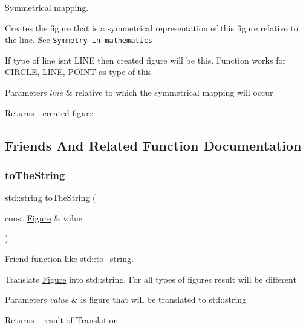 Symmetrical mapping. 

Creates the figure that is a symmetrical representation of \textquotesingle{}this\textquotesingle{} figure relative to the \textquotesingle{}line\textquotesingle{}. See \href{https://en.wikipedia.org/wiki/Symmetry_in_mathematics}{\tt Symmetry in mathematics}

If type of \textquotesingle{}line\textquotesingle{} isn\textquotesingle{}t L\+I\+NE then created figure will be \textquotesingle{}this\textquotesingle{}. Function works for C\+I\+R\+C\+LE, L\+I\+NE, P\+O\+I\+NT as type of \textquotesingle{}this\textquotesingle{}


\begin{DoxyParams}{Parameters}
{\em line} & relative to which the symmetrical mapping will occur \\
\hline
\end{DoxyParams}
\begin{DoxyReturn}{Returns}
-\/ created figure 
\end{DoxyReturn}


\subsection{Friends And Related Function Documentation}
\mbox{\label{classfop_1_1_figure_a64f76b9a0cc2e1c8d1f1a8a025e76078}} 
\subsubsection{\texorpdfstring{to\+The\+String}{toTheString}}
{\footnotesize\ttfamily std\+::string to\+The\+String (\begin{DoxyParamCaption}\item[{const \mbox{\hyperlink{classfop_1_1_figure}{Figure}} \&}]{value }\end{DoxyParamCaption})\hspace{0.3cm}{\ttfamily [friend]}}



Friend function like std\+::to\+\_\+string. 

Translate \mbox{\hyperlink{classfop_1_1_figure}{Figure}} into std\+::string. For all types of figures result will be different


\begin{DoxyParams}{Parameters}
{\em value} & is figure that will be translated to std\+::string \\
\hline
\end{DoxyParams}
\begin{DoxyReturn}{Returns}
-\/ result of Translation 
\end{DoxyReturn}


